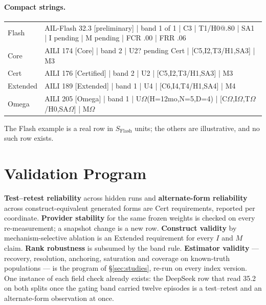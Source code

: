 \documentclass[11pt]{article}
\theoremstyle{definition}
\newcommand{\Om}{\ensuremath{\Omega}}
\begin{document}
\paragraph{Compact strings.}
\begin{center}\footnotesize
\begin{tabularx}{\textwidth}{@{}l >{\raggedright\arraybackslash\ttfamily}X@{}}
Flash & AIL-Flash 32.3 [preliminary] | band 1 of 1 | C3 | T1/H0@.80 | SA1 | I pending | M pending | FCR .00 | FRR .06 \\
Core & AILI 174 [Core] | band 2 | U2? pending Cert | [C5,I2,T3/H1,SA3] | M3 \\
Cert & AILI 176 [Certified] | band 2 | U2 | [C5,I2,T3/H1,SA3] | M3 \\
Extended & AILI 189 [Extended] | band 1 | U4 | [C6,I4,T4/H1,SA4] | M4 \\
Omega & AILI 205 [Omega] | band 1 | U$\Om$(H=12mo,N=5,D=4) | [C$\Om$,I$\Om$,T$\Om$/H0,SA$\Om$] | M$\Om$ \\
\end{tabularx}
\end{center}
\noindent The Flash example is a real row in $S_{\mathrm{Flash}}$ units; the others are illustrative, and no such row exists.

\section{Validation Program}\label{sec:validation}

\textbf{Test--retest reliability} across hidden runs and \textbf{alternate-form reliability} across construct-equivalent generated forms are Cert requirements, reported per coordinate. \textbf{Provider stability} for the same frozen weights is checked on every re-measurement; a snapshot change is a new row. \textbf{Construct validity} by mechanism-selective ablation is an Extended requirement for every $I$ and $M$ claim. \textbf{Rank robustness} is subsumed by the band rule. \textbf{Estimator validity} --- recovery, resolution, anchoring, saturation and coverage on known-truth populations --- is the program of \S\ref{sec:studies}, re-run on every index version. One instance of each field check already exists: the DeepSeek row that read 35.2 on both splits once the gating band carried twelve episodes is a test--retest and an alternate-form observation at once.
\end{document}
